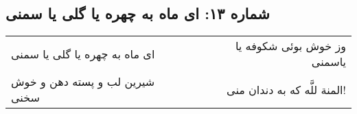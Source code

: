 \begin{center}
\section*{شماره ۱۳: ای ماه به چهره یا گلی یا سمنی}
\label{sec:013}
\begin{longtable}{l p{0.5cm} r}
ای ماه به چهره یا گلی یا سمنی
&&
وز خوش بوئی شکوفه یا یاسمنی
\\
شیرین لب و پسته دهن و خوش سخنی
&&
المنة للَّه که به دندان منی!
\\
\end{longtable}
\end{center}
